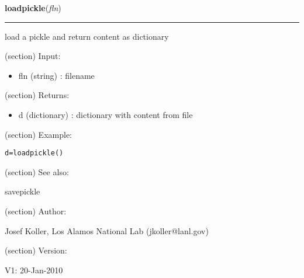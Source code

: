 \hspace{.8\funcindent}\begin{boxedminipage}{\funcwidth}

    \raggedright \textbf{loadpickle}(\textit{fln})

    \vspace{-1.5ex}

    \rule{\textwidth}{0.5\fboxrule}
\setlength{\parskip}{2ex}
    load a pickle and return content as dictionary

    (section) Input:

      \begin{itemize}
      \setlength{\parskip}{0.6ex}
        \item fln (string) : filename

      \end{itemize}

    (section) Returns:

      \begin{itemize}
      \setlength{\parskip}{0.6ex}
        \item d (dictionary) : dictionary with content from file

      \end{itemize}

    (section) Example:

\begin{alltt}
\pysrcprompt{{\textgreater}{\textgreater}{\textgreater} }d = loadpickle()\end{alltt}
    (section) See also:

      savepickle

    (section) Author:

      Josef Koller, Los Alamos National Lab (jkoller@lanl.gov)

    (section) Version:

      V1: 20-Jan-2010

\setlength{\parskip}{1ex}
    \end{boxedminipage}

    \label{spacepy:toolbox:savepickle}

    \vspace{0.5ex}

